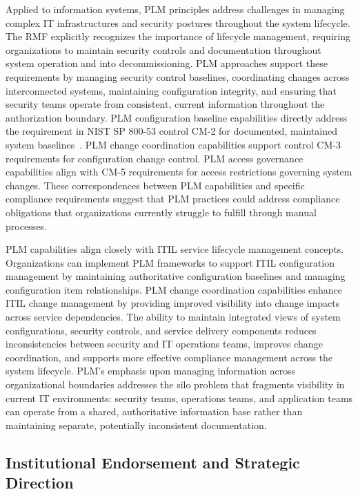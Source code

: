 Applied to information systems, PLM principles address challenges in managing complex IT infrastructures and security postures throughout the system lifecycle. The RMF explicitly recognizes the importance of lifecycle management, requiring organizations to maintain security controls and documentation throughout system operation and into decommissioning. PLM approaches support these requirements by managing security control baselines, coordinating changes across interconnected systems, maintaining configuration integrity, and ensuring that security teams operate from consistent, current information throughout the authorization boundary. PLM configuration baseline capabilities directly address the requirement in NIST SP 800-53 control CM-2 for documented, maintained system baselines~\parencite{Force_2020}. PLM change coordination capabilities support control CM-3 requirements for configuration change control. PLM access governance capabilities align with CM-5 requirements for access restrictions governing system changes. These correspondences between PLM capabilities and specific compliance requirements suggest that PLM practices could address compliance obligations that organizations currently struggle to fulfill through manual processes.

PLM capabilities align closely with ITIL service lifecycle management concepts. Organizations can implement PLM frameworks to support ITIL configuration management by maintaining authoritative configuration baselines and managing configuration item relationships. PLM change coordination capabilities enhance ITIL change management by providing improved visibility into change impacts across service dependencies. The ability to maintain integrated views of system configurations, security controls, and service delivery components reduces inconsistencies between security and IT operations teams, improves change coordination, and supports more effective compliance management across the system lifecycle. PLM's emphasis upon managing information across organizational boundaries addresses the silo problem that fragments visibility in current IT environments: security teams, operations teams, and application teams can operate from a shared, authoritative information base rather than maintaining separate, potentially inconsistent documentation.

\subsection{Institutional Endorsement and Strategic Direction}

